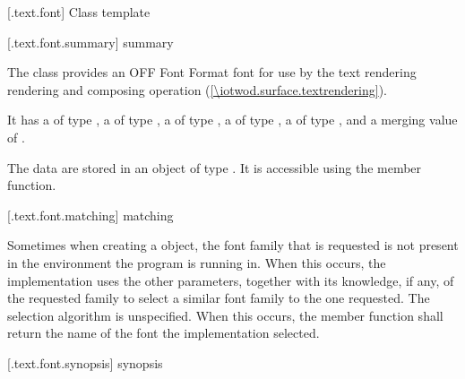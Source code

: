 
 [\iotwod.text.font] {Class template }

 [\iotwod.text.font.summary] { summary}

\pnum
{}%
The  class provides an OFF Font Format font for use by the text rendering rendering and composing operation (\ref{\iotwod.surface.textrendering}).

\pnum
It has a  of type , a  of type , a  of type , a  of type , a  of type , and a merging value of .

\pnum
The data are stored in an object of type . It is accessible using the  member function.

 [\iotwod.text.font.matching]{ matching}

\pnum
Sometimes when creating a  object, the font family that is requested is not present in the environment the program is running in. When this occurs, the implementation uses the other parameters, together with its knowledge, if any, of the requested family to select a similar font family to the one requested. The selection algorithm is unspecified. When this occurs, the  member function shall return the name of the font the implementation selected.

 [\iotwod.text.font.synopsis] { synopsis}

